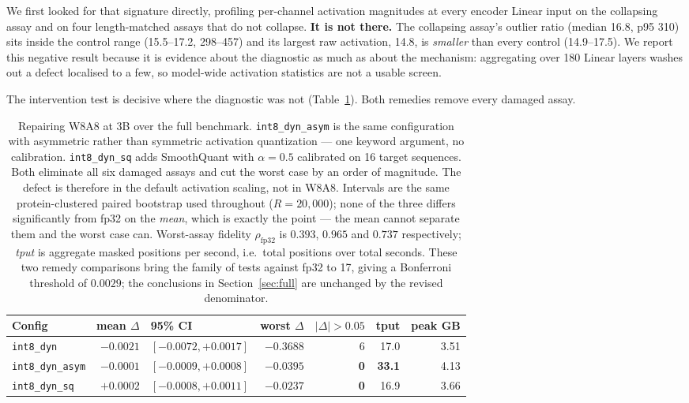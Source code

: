 \documentclass[11pt]{article}
\newcommand{\cfg}[1]{\texttt{#1}}
\begin{document}
We first looked for that signature directly, profiling per-channel activation
magnitudes at every encoder Linear input on the collapsing assay and on four
length-matched assays that do not collapse. \textbf{It is not there.} The
collapsing assay's outlier ratio (median 16.8, p95 310) sits inside the control
range (15.5--17.2, 298--457) and its largest raw activation, 14.8, is
\emph{smaller} than every control (14.9--17.5). We report this negative result
because it is evidence about the diagnostic as much as about the mechanism:
aggregating over 180 Linear layers washes out a defect localised to a few, so
model-wide activation statistics are not a usable screen.

The intervention test is decisive where the diagnostic was not
(Table~\ref{tab:w8a8}). Both remedies remove every damaged assay.

\begin{table}[htb]
\centering
\caption{Repairing W8A8 at 3B over the full benchmark. \cfg{int8\_dyn\_asym} is
the same configuration with asymmetric rather than symmetric activation
quantization --- one keyword argument, no calibration. \cfg{int8\_dyn\_sq} adds
SmoothQuant with $\alpha = 0.5$ calibrated on 16 target sequences. Both
eliminate all six damaged assays and cut the worst case by an order of
magnitude. The defect is therefore in the default activation scaling, not in
W8A8. Intervals are the same protein-clustered paired bootstrap used throughout
($R = 20{,}000$); none of the three differs significantly from fp32 on the
\emph{mean}, which is exactly the point --- the mean cannot separate them and
the worst case can. Worst-assay fidelity $\rho_{\text{fp32}}$ is $0.393$,
$0.965$ and $0.737$ respectively; \emph{tput} is aggregate masked positions per
second, i.e.\ total positions over total seconds. These two remedy comparisons
bring the family
of tests against fp32 to 17, giving a Bonferroni threshold of $0.0029$; the
conclusions in Section~\ref{sec:full} are unchanged by the revised denominator.}
\label{tab:w8a8}
\small
\begin{tabular}{lrlrrrr}
\toprule
Config & mean $\Delta$ & 95\% CI & worst $\Delta$ & $|\Delta|>0.05$ & tput & peak GB \\
\midrule
\cfg{int8\_dyn}       & $-0.0021$ & $[-0.0072,+0.0017]$ & $\mathbf{-0.3688}$ & 6 & 17.0 & 3.51 \\
\cfg{int8\_dyn\_asym} & $-0.0001$ & $[-0.0009,+0.0008]$ & $-0.0395$ & \textbf{0} & \textbf{33.1} & 4.13 \\
\cfg{int8\_dyn\_sq}   & $+0.0002$ & $[-0.0008,+0.0011]$ & $\mathbf{-0.0237}$ & \textbf{0} & 16.9 & 3.66 \\
\bottomrule
\end{tabular}
\end{table}
\end{document}
